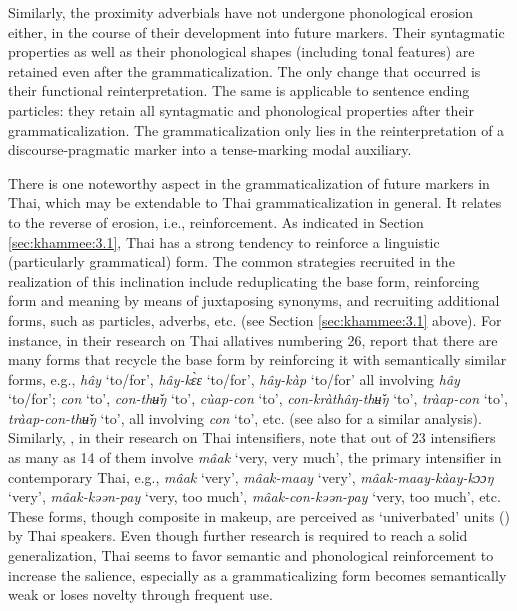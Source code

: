 \documentclass[output=paper,colorlinks,citecolor=brown]{langscibook}
\begin{document}
Similarly, the proximity adverbials have not undergone phonological erosion either, in the course of their development into future markers. Their syntagmatic properties as well as their phonological shapes (including tonal features) are retained even after the grammaticalization. The only change that occurred is their functional reinterpretation. The same is applicable to sentence ending particles: they retain all syntagmatic and phonological properties after their grammaticalization. The grammaticalization only lies in the reinterpretation of a discourse-pragmatic marker into a tense-marking modal auxiliary.

There is one noteworthy aspect in the grammaticalization of future markers in Thai, which may be extendable to Thai grammaticalization in general. It relates to the reverse of erosion, i.e., reinforcement. As indicated in Section \ref{sec:khammee:3.1}, Thai has a strong tendency to reinforce a linguistic (particularly grammatical) form. The common strategies recruited in the realization of this inclination include reduplicating the base form, reinforcing form and meaning by means of juxtaposing synonyms, and recruiting additional forms, such as particles, adverbs, etc. (see Section \ref{sec:khammee:3.1} above). For instance, in their research on Thai allatives numbering 26, \citet[]{RheeKhammee2022} report that there are many forms that recycle the base form by reinforcing it with semantically similar forms, e.g., \textit{hây} ‘to/for’, \textit{hây-kɛ̀ɛ} ‘to/for’, \textit{hây-kàp} ‘to/for’ all involving \textit{hây} ‘to/for’; \textit{con} ‘to’, \textit{con-thʉ̌ŋ} ‘to’, \textit{cùap-con} ‘to’, \textit{con-kràthâŋ-thʉ̌ŋ} ‘to’, \textit{tràap-con} ‘to’, \textit{tràap-con-thʉ̌ŋ} ‘to’, all involving \textit{con }‘to’, etc. (see also \cite{khammee2025goal} for a similar analysis). Similarly, \citet[]{ThirakunkovitRhee2023}, in their research on Thai intensifiers, note that out of 23 intensifiers as many as 14 of them involve \textit{mâak} ‘very, very much’, the primary intensifier in contemporary Thai, e.g., \textit{mâak} ‘very’, \textit{mâak-maay} ‘very’, \textit{mâak-maay-kàay-kɔɔŋ} ‘very’, \textit{mâak-kəən-pay} ‘very, too much’, \textit{mâak-con-kəən-pay} ‘very, too much’, etc. These forms, though composite in makeup, are perceived as ‘univerbated’ units (\cite{Lehmann2015}) by Thai speakers. Even though further research is required to reach a solid generalization, Thai seems to favor semantic and phonological reinforcement to increase the salience, especially as a grammaticalizing form becomes semantically weak or loses novelty through frequent use.
\end{document}
